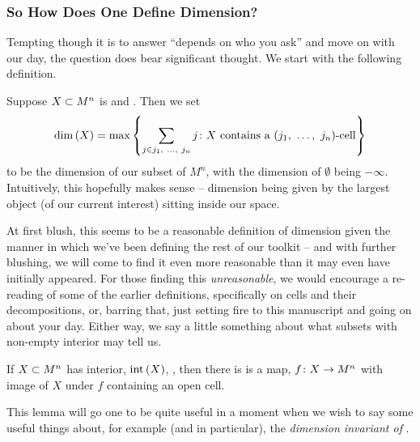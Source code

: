 \subsubsection{So How Does One Define Dimension?}
\label{sec:defn_dim}

\noindent Tempting though it is to answer ``depends on who you ask'' and move on with our day, the question does bear significant thought. We start with the following definition.

\begin{definition}[Dimension]
  Suppose $\XsubsetMn$ is  and \inhb. Then we set 
  \begin{align*}
    \dim{X} = \max{ \left\{ \sum_{j \in \vonevm{j}{n}} j \colon X \textrm{ contains a } \vmcell{j}{n} \right\} }
  \end{align*}
  to be the dimension of our subset of $M^n$, with the dimension of $\emptyset$ being $- \infty$. Intuitively, this hopefully makes sense -- dimension being given by the largest object (of our current interest) sitting inside our space.
  \label{defn:defn_dim}
\end{definition}

At first blush, this seems to be a reasonable definition of dimension given the manner in which we've been defining the rest of our toolkit -- and with further blushing, we will come to find it even more reasonable than it may even have initially appeared. For those finding this \emph{unreasonable}, we would encourage a re-reading of some of the earlier definitions, specifically on cells and their decompositions, or, barring that, just setting fire to this manuscript and going on about your day. Either way, we say a little something about what subsets with non-empty interior may tell us.

\begin{lemma}
  \label{lemma:interior-open-cell}
  If $\XsubsetMn[n]$ has interior, $\inter{X}$, \inhb, then there is is a  \inj map, $\funcdom{f}{X}{M^n}$ with image of $X$ under $f$ containing an open cell.
\end{lemma}
This lemma will go one to be quite useful in a moment when we wish to say some useful things about, for example (and in particular), the \emph{dimension invariant of  \bijtions }.

